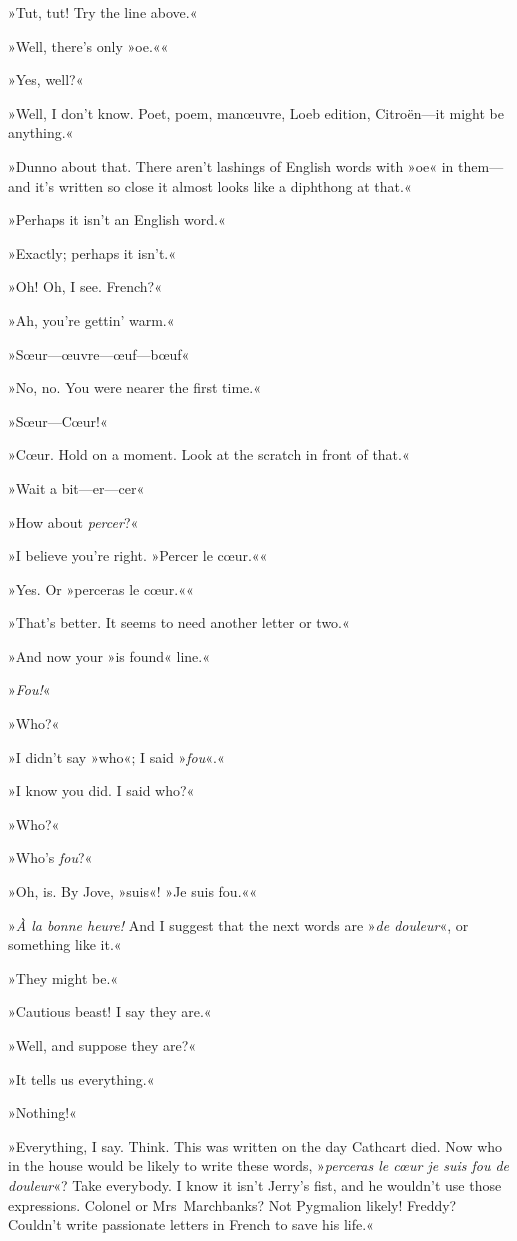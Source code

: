 »Tut, tut! Try the line above.«

»Well, there's only »oe.««

»Yes, well?«

»Well, I don't know. Poet, poem, manœuvre, Loeb edition, Citroën—it might be anything.«

»Dunno about that. There aren't lashings of English words with »oe« in them—and it's written so close it almost looks like a diphthong at that.«

»Perhaps it isn't an English word.«

»Exactly; perhaps it isn't.«

»Oh! Oh, I see. French?«

»Ah, you're gettin' warm.«

»Sœur—œuvre—œuf—bœuf\longdash«

»No, no. You were nearer the first time.«

»Sœur—Cœur!«

»Cœur. Hold on a moment. Look at the scratch in front of that.«

»Wait a bit—er—cer\longdash«

»How about \textit{percer}?«

»I believe you're right. »Percer le cœur.««

»Yes. Or »perceras le cœur.««

»That's better. It seems to need another letter or two.«

»And now your »is found« line.«

»\textit{Fou!}«

»Who?«

»I didn't say »who«; I said »\textit{fou}«.«

»I know you did. I said who?«

»Who?«

»Who's \textit{fou}?«

»Oh, is. By Jove, »suis«! »Je suis fou.««

»\textit{À la bonne heure!} And I suggest that the next words are »\textit{de douleur}«, or something like it.«

»They might be.«

»Cautious beast! I say they are.«

»Well, and suppose they are?«

»It tells us everything.«

»Nothing!«

»Everything, I say. Think. This was written on the day Cathcart died. Now who in the house would be likely to write these words, »\textit{perceras le cœur \textellipsis  je suis fou de douleur}«? Take everybody. I know it isn't Jerry's fist, and he wouldn't use those expressions. Colonel or Mrs~Marchbanks? Not Pygmalion likely! Freddy? Couldn't write passionate letters in French to save his life.«

